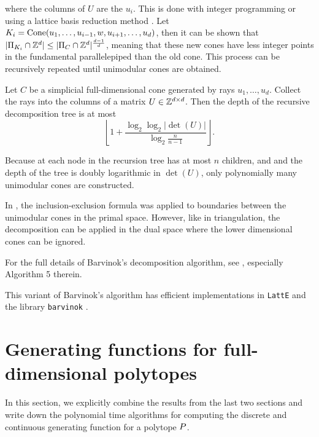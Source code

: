  where the columns of $U$ are the $u_i$. This is done with integer programming or using a lattice basis reduction method \cite{latte1}. Let $K_i = \operatorname{Cone}(u_1, \dots, u_{i-1}, w, u_{i+1}, \dots, u_d)$, then it can be shown that $|\Pi_{K_i} \cap {\mathbb Z}^d| \leq |\Pi_{C} \cap {\mathbb Z}^d|^{\frac{d-1}{d}}$, meaning that these new cones have less integer points in the fundamental parallelepiped than the old cone. This process can be recursively repeated until unimodular cones are obtained. 
 
\begin{theorem}
Let $C$ be a simplicial full-dimensional cone generated by rays $u_1, \dots, u_d$. Collect the rays into the columns of a matrix $U \in {\mathbb Z}^{d \times d}$. Then the depth of the recursive decomposition tree is at most 
\[ \left\lfloor 1 + \frac{\log_2 \log_2 |\det(U)|}{\log_2 \frac{n}{n-1}} \right\rfloor. \]
\end{theorem}

Because at each node in the recursion tree has at most $n$ children, and and the depth of the tree is doubly logarithmic in $\det(U)$, only polynomially many unimodular cones are constructed. 

In \cite{bar}, the inclusion-exclusion formula was applied to boundaries between the unimodular cones in the primal space. However, like in triangulation, the decomposition can be applied in the dual space where the lower dimensional cones can be ignored. 

For the full details of Barvinok's decomposition algorithm, see \cite{latte1}, especially Algorithm 5 therein.

This variant of Barvinok’s algorithm has
efficient implementations in \texttt{LattE}  \cite{latte-1.2} and the library \texttt{barvinok} \cite{barvinok-noversion}.


\section{Generating functions for full-dimensional polytopes}

In this section, we explicitly combine the results from the last two sections and write down the polynomial time algorithms for computing the discrete and continuous generating function for a polytope ${ P}$.


